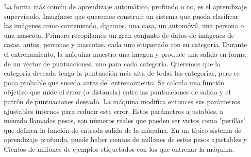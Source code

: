 La forma más común de aprendizaje automático, profundo o no, es el aprendizaje supervisado. Imagínese que queremos construir un sistema que pueda clasificar las imágenes como conteniendo, digamos, una casa, un automóvil, una persona o una mascota. Primero recopilamos un gran conjunto de datos de imágenes de casas, autos, personas y mascotas, cada uno etiquetado con su categoría. Durante el entrenamiento, la máquina muestra una imagen y produce una salida en forma de un vector de puntuaciones, uno para cada categoría. Queremos que la categoría deseada tenga la puntuación más alta de todas las categorías, pero es poco probable que suceda antes del entrenamiento. Se calcula una función objetivo que mide el error (o distancia) entre las puntuaciones de salida y el patrón de puntuaciones deseado. La máquina modifica entonces sus parámetros ajustables internos para reducir este error. Estos parámetros ajustables, a menudo llamados pesos, son números reales que pueden ser vistos como "perillas" que definen la función de entrada-salida de la máquina. En un típico sistema de aprendizaje profundo, puede haber cientos de millones de estos pesos ajustables y Cientos de millones de ejemplos etiquetados con los que entrenar la máquina.







